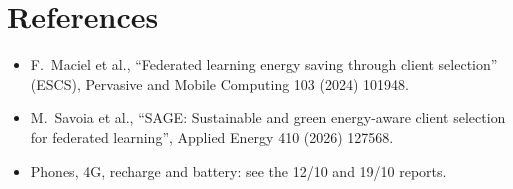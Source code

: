\documentclass[11pt,a4paper]{article}
\begin{document}
\section*{References}

\begin{itemize}
  \item F.~Maciel et al., ``Federated learning energy saving through client
        selection'' (ESCS), Pervasive and Mobile Computing 103 (2024) 101948.
  \item M.~Savoia et al., ``SAGE: Sustainable and green energy-aware client
        selection for federated learning'', Applied Energy 410 (2026) 127568.
  \item Phones, 4G, recharge and battery: see the 12/10 and 19/10 reports.
\end{itemize}
\end{document}
